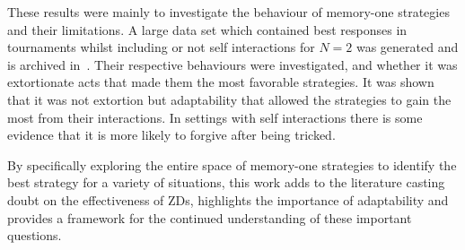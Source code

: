 These results were mainly to investigate the behaviour of memory-one strategies
and their limitations. A large data set which contained best responses in
tournaments whilst including or not self interactions for \(N=2\) was generated
and is archived in~\cite{glynatsi2019}. Their
respective behaviours were investigated, and whether it was extortionate acts that made them the
most favorable strategies. It was shown that it was not extortion but
adaptability that allowed the strategies to gain the most from their
interactions. In settings with self interactions there is some evidence that it
is more likely to forgive after being tricked.

By specifically exploring the entire space of memory-one strategies to identify
the best strategy for a variety of situations, this work adds to the literature
casting doubt on the effectiveness of ZDs, highlights the importance of
adaptability and provides a framework for the continued understanding of these
important questions.
